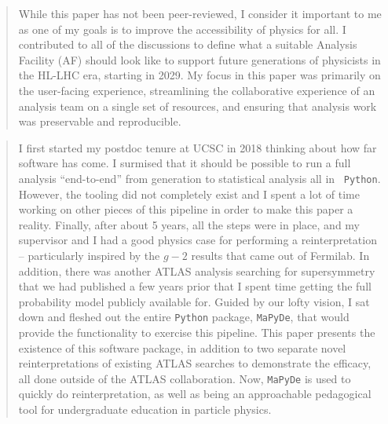 \begin{quotation}
	While this paper has not been peer-reviewed, I consider it important to me as one of my goals is to improve the accessibility of physics for all.
	I contributed to all of the discussions to define what a suitable Analysis Facility (AF) should look like to support future generations of physicists in the HL-LHC era, starting in 2029.
	My focus in this paper was primarily on the user-facing experience, streamlining the collaborative experience of an analysis team on a single set of resources, and ensuring that analysis work was preservable and reproducible.
\end{quotation}

\begin{quotation}
	I first started my postdoc tenure at UCSC in 2018 thinking about how far software has come.
	I surmised that it should be possible to run a full analysis \enquote{end-to-end} from generation to statistical analysis all in ~\texttt{Python}.
	However, the tooling did not completely exist and I spent a lot of time working on other pieces of this pipeline in order to make this paper a reality.
	Finally, after about 5 years, all the steps were in place, and my supervisor and I had a good physics case for performing a reinterpretation -- particularly inspired by the $g-2$ results that came out of Fermilab.
	In addition, there was another ATLAS analysis searching for supersymmetry that we had published a few years prior that I spent time getting the full probability model publicly available for.
	Guided by our lofty vision, I sat down and fleshed out the entire \texttt{Python} package, \texttt{MaPyDe}, that would provide the functionality to exercise this pipeline.
	This paper presents the existence of this software package, in addition to two separate novel reinterpretations of existing ATLAS searches to demonstrate the efficacy, all done outside of the ATLAS collaboration.
	Now, \texttt{MaPyDe} is used to quickly do reinterpretation, as well as being an approachable pedagogical tool for undergraduate education in particle physics.
\end{quotation}

